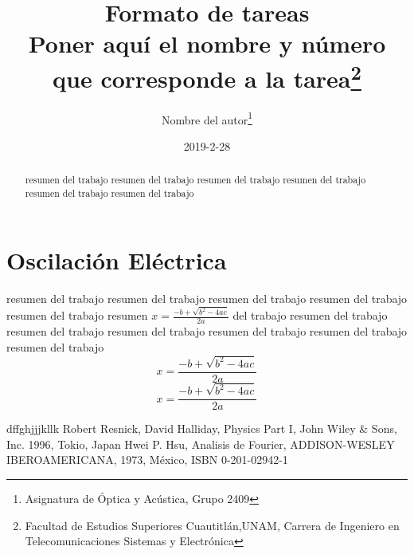 \documentclass{article}
\title{Formato de tareas\\Poner aqu\'i el nombre y n\'umero que corresponde a la tarea\thanks{Facultad de Estudios Superiores Cuautitl\'an,UNAM, Carrera de Ingeniero en Telecomunicaciones Sistemas y Electr\'onica}}
\author{Nombre del autor\thanks{Asignatura de \'Optica y Ac\'ustica, Grupo 2409}}
\date{2019-2-28}
\begin{document}
\maketitle
\begin{abstract}
resumen del trabajo resumen del trabajo resumen del trabajo resumen del trabajo resumen del trabajo resumen del trabajo
\end{abstract}
\section{Oscilaci\'on El\'ectrica} resumen del trabajo resumen del trabajo resumen del trabajo resumen del trabajo resumen del trabajo resumen $x=\frac{-b+\sqrt{b^2-4a c}}{2a}$\cite{n01} del trabajo resumen del trabajo resumen del trabajo resumen del trabajo resumen del trabajo resumen del trabajo resumen del trabajo
$$x=\frac{-b+\sqrt{b^2-4a c}}{2a}$$
\begin{equation} x=\frac{-b+\sqrt{b^2-4a c}}{2a}
\end{equation}

\begin{thebibliography}{22}
 dffghjjjkllk
  Robert Resnick, David Halliday, Physics Part I, John Wiley 
\& Sons, Inc. 1996, Tokio, Japan
  Hwei P. Hsu, Analisis de Fourier, ADDISON-WESLEY 
IBEROAMERICANA, 1973, M\'exico, ISBN 0-201-02942-1
\end{thebibliography}
\end{document}
